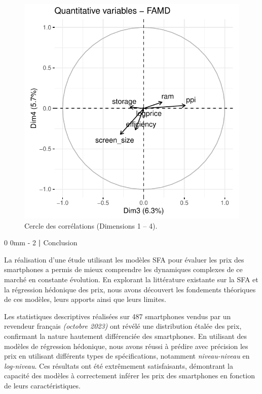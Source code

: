 \documentclass[
  12pt,
]{report}
\makeatletter
\renewcommand{\chapter}{%
    \clearpage %
    \@startsection{chapter}%
    {0} %
    {0mm} %
    {-\baselineskip} %
    {2\baselineskip} %
    {\normalfont\Huge\bfseries | \Huge\bfseries}%
}
\makeatother
\begin{document}
\begin{figure}[H]

{\centering \includegraphics{report_files/figure-pdf/unnamed-chunk-13-2.pdf}

}

\caption{Cercle des corrélations (Dimensions 1 -- 4).}

\end{figure}%

\chapter{Conclusion}\label{conclusion-2}

La réalisation d'une étude utilisant les modèles SFA pour évaluer les
prix des smartphones a permis de mieux comprendre les dynamiques
complexes de ce marché en constante évolution. En explorant la
littérature existante sur la SFA et la régression hédonique des prix,
nous avons découvert les fondements théoriques de ces modèles, leurs
apports ainsi que leurs limites.

Les statistiques descriptives réalisées sur 487 smartphones vendus par
un revendeur français \emph{(octobre 2023)} ont révélé une distribution
étalée des prix, confirmant la nature hautement différenciée des
smartphones. En utilisant des modèles de régression hédonique, nous
avons réussi à prédire avec précision les prix en utilisant différents
types de spécifications, notamment \emph{niveau-niveau} en
\emph{log-niveau}. Ces résultats ont été extrêmement satisfaisants,
démontrant la capacité des modèles à correctement inférer les prix des
smartphones en fonction de leurs caractéristiques.
\end{document}
